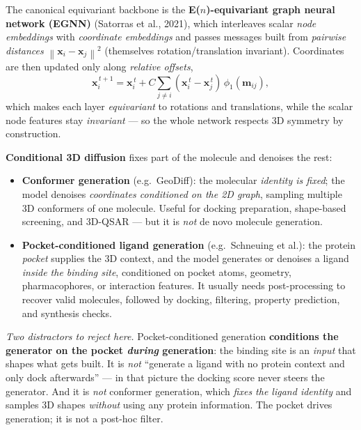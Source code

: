 \documentclass[11pt, oneside]{book}
\newcommand{\norm}[1]{\left\lVert #1 \right\rVert}
\newcommand{\xvec}{\mathbf{x}}
\begin{document}
The canonical equivariant backbone is the \textbf{E($n$)-equivariant graph neural
network (EGNN)} (Satorras et al., 2021), which interleaves scalar \emph{node
embeddings} with \emph{coordinate embeddings} and passes messages built from
\emph{pairwise distances} $\norm{\xvec_i-\xvec_j}^2$ (themselves rotation/translation
invariant). Coordinates are then updated only along \emph{relative offsets},
\[
  \xvec_i^{\,t+1} = \xvec_i^{\,t} + C\!\!\sum_{j\neq i}(\xvec_i^{\,t}-\xvec_j^{\,t})\,
  \phi_1(\boldsymbol{m}_{ij}),
\]
which makes each layer \emph{equivariant} to rotations and translations, while the
scalar node features stay \emph{invariant} --- so the whole network respects 3D
symmetry by construction.

\textbf{Conditional 3D diffusion} fixes part of the molecule and denoises the rest:
\begin{itemize}
  \item \textbf{Conformer generation} (e.g.\ GeoDiff): the molecular \emph{identity is
        fixed}; the model denoises \emph{coordinates conditioned on the 2D graph},
        sampling multiple 3D conformers of one molecule. Useful for docking
        preparation, shape-based screening, and 3D-QSAR --- but it is \emph{not} de
        novo molecule generation.
  \item \textbf{Pocket-conditioned ligand generation} (e.g.\ Schneuing et al.): the
        protein \emph{pocket} supplies the 3D context, and the model generates or
        denoises a ligand \emph{inside the binding site}, conditioned on pocket atoms,
        geometry, pharmacophores, or interaction features. It usually needs
        post-processing to recover valid molecules, followed by docking, filtering,
        property prediction, and synthesis checks.
\end{itemize}

\noindent\emph{Two distractors to reject here.} Pocket-conditioned generation
\textbf{conditions the generator on the pocket \emph{during} generation}: the binding
site is an \emph{input} that shapes what gets built. It is \emph{not} ``generate a
ligand with no protein context and only dock afterwards'' --- in that picture the
docking score never steers the generator. And it is \emph{not} conformer generation,
which \emph{fixes the ligand identity} and samples 3D shapes \emph{without} using any
protein information. The pocket drives generation; it is not a post-hoc filter.


\end{document}

